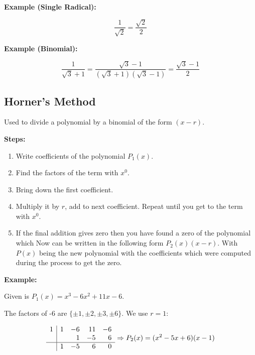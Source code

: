 \textbf{Example (Single Radical):}

\[
  \frac{1}{\sqrt{2}} = \frac{\sqrt{2}}{2}
\]

\textbf{Example (Binomial):}

\[
  \frac{1}{\sqrt{3} + 1} = \frac{\sqrt{3} - 1}{(\sqrt{3} + 1)(\sqrt{3} - 1)} = \frac{\sqrt{3} - 1}{2}
\]

\subsection{Horner’s Method}

Used to divide a polynomial by a binomial of the form \((x - r)\).

\textbf{Steps:}

\begin{enumerate}

  \item Write coefficients of the polynomial \(P_1(x)\).

  \item Find the factors of the term with \(x^0\).
   
  \item Bring down the first coefficient.

  \item Multiply it by \(r\), add to next coefficient. Repeat until you get to 
        the term with \(x^0\).
  
  \item If the final addition gives zero then you have found a zero of the polynomial which  
        Now can be written in the following form \(P_2(x)(x - r)\). With \(P(x)\) being the 
        new polynomial with the coefficients which were computed during the process to get the zero.

\end{enumerate}

\textbf{Example:}

Given is \(P_1(x) = x^3 - 6x^2 + 11x - 6\).

The factors of -6 are \(\{\pm 1, \pm 2, \pm 3, \pm 6\}\). We use \(r = 1\):

\[
  \begin{array}{r|rrrr}
  1 & 1 & -6 & 11 & -6 \\
    &   & 1 & -5 & 6 \\
  \hline
    & 1 & -5 & 6 & 0 \\
  \end{array}
  \Rightarrow P_2(x) = (x^2 - 5x + 6)(x - 1)
\]

